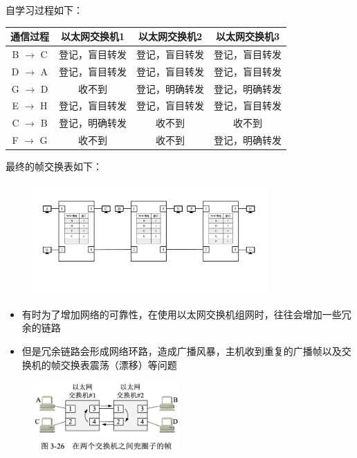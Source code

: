 \documentclass[cs4size,a4paper,10pt]{ctexart}
\begin{document}
	自学习过程如下：
	\begin{table}[H]
		\centering
		\begin{tabular}{|c|c|c|c|}
		\hline
		通信过程              & 以太网交换机1 & 以太网交换机2 & 以太网交换机3 \\ \hline
		B $\rightarrow$ C & 登记，盲目转发 & 登记，盲目转发 & 登记，盲目转发 \\ \hline
		D $\rightarrow$ A             & 登记，盲目转发 & 登记，盲目转发 & 登记，盲目转发 \\ \hline
		G $\rightarrow$ D             & 收不到     & 登记，明确转发 & 登记，明确转发 \\ \hline
		E $\rightarrow$ H             & 登记，盲目转发 & 登记，盲目转发 & 登记，盲目转发 \\ \hline
		C $\rightarrow$ B             & 登记，明确转发 & 收不到     & 收不到     \\ \hline
		F $\rightarrow$ G             & 收不到     & 收不到     & 登记，明确转发 \\ \hline
		\end{tabular}
	\end{table}

	最终的帧交换表如下：
	\begin{figure}[H]
		\centering
		\includegraphics[width=0.8\textwidth]{img/3.5.2.2.2}
	\end{figure}

	\begin{itemize}
		\item 有时为了增加网络的可靠性，在使用以太网交换机组网时，往往会增加一些冗余的链路
		\item 但是冗余链路会形成网络环路，造成广播风暴，主机收到重复的广播帧以及交换机的帧交换表震荡（漂移）等问题
	\end{itemize}

	\begin{figure}[H]
		\centering
		\includegraphics[width=0.5\textwidth]{img/3.26}
	\end{figure}
\end{document}
